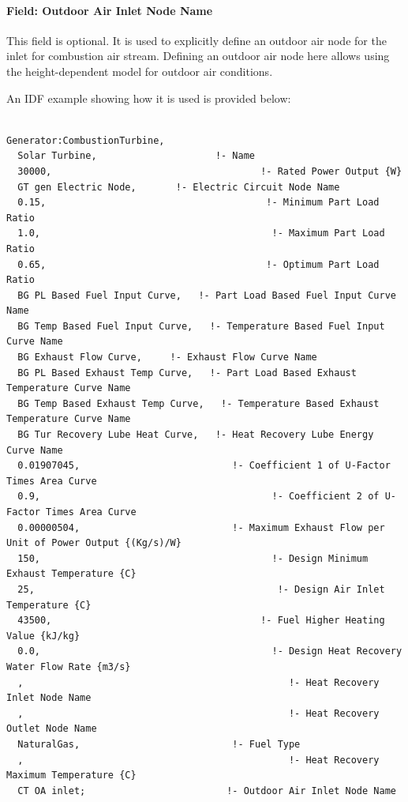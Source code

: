 \paragraph{Field: Outdoor Air Inlet Node Name}\label{field-outdoor-air-inlet-node-name-001}

This field is optional. It is used to explicitly define an outdoor air node for the inlet for combustion air stream. Defining an outdoor air node here allows using the height-dependent model for outdoor air conditions.

An IDF example showing how it is used is provided below:

\begin{lstlisting}

Generator:CombustionTurbine,
  Solar Turbine,                     !- Name
  30000,                                     !- Rated Power Output {W}
  GT gen Electric Node,       !- Electric Circuit Node Name
  0.15,                                       !- Minimum Part Load Ratio
  1.0,                                         !- Maximum Part Load Ratio
  0.65,                                       !- Optimum Part Load Ratio
  BG PL Based Fuel Input Curve,   !- Part Load Based Fuel Input Curve Name
  BG Temp Based Fuel Input Curve,   !- Temperature Based Fuel Input Curve Name
  BG Exhaust Flow Curve,     !- Exhaust Flow Curve Name
  BG PL Based Exhaust Temp Curve,   !- Part Load Based Exhaust Temperature Curve Name
  BG Temp Based Exhaust Temp Curve,   !- Temperature Based Exhaust Temperature Curve Name
  BG Tur Recovery Lube Heat Curve,   !- Heat Recovery Lube Energy Curve Name
  0.01907045,                           !- Coefficient 1 of U-Factor Times Area Curve
  0.9,                                         !- Coefficient 2 of U-Factor Times Area Curve
  0.00000504,                           !- Maximum Exhaust Flow per Unit of Power Output {(Kg/s)/W}
  150,                                         !- Design Minimum Exhaust Temperature {C}
  25,                                           !- Design Air Inlet Temperature {C}
  43500,                                     !- Fuel Higher Heating Value {kJ/kg}
  0.0,                                         !- Design Heat Recovery Water Flow Rate {m3/s}
  ,                                               !- Heat Recovery Inlet Node Name
  ,                                               !- Heat Recovery Outlet Node Name
  NaturalGas,                           !- Fuel Type
  ,                                               !- Heat Recovery Maximum Temperature {C}
  CT OA inlet;                         !- Outdoor Air Inlet Node Name


\end{lstlisting}
